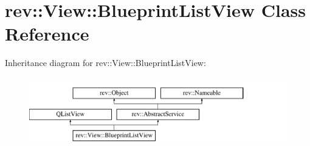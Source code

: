 \hypertarget{classrev_1_1_view_1_1_blueprint_list_view}{}\section{rev\+::View\+::Blueprint\+List\+View Class Reference}
\label{classrev_1_1_view_1_1_blueprint_list_view}
Inheritance diagram for rev\+::View\+::Blueprint\+List\+View\+:\begin{figure}[H]
\begin{center}
\leavevmode
\includegraphics[height=3.000000cm]{classrev_1_1_view_1_1_blueprint_list_view}
\end{center}
\end{figure}
